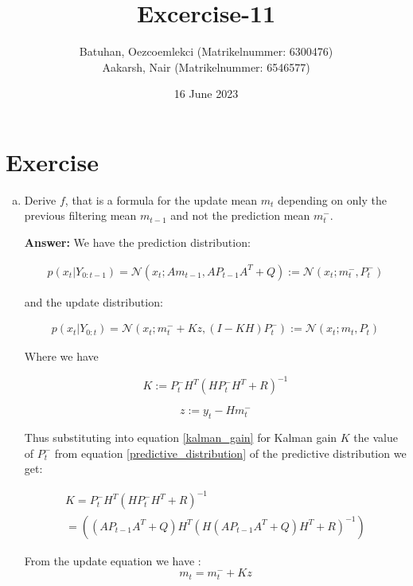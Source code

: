 \documentclass{tufte-handout}
\title{Excercise-11}
\author{Batuhan, Oezcoemlekci (Matrikelnummer: 6300476) \\
         Aakarsh, Nair (Matrikelnummer: 6546577)}
\date{16 June 2023}
\begin{document}
\maketitle%

\section{Exercise}

\begin{enumerate}[(a)]
    \item Derive $f$, that is a formula for the update mean $m_t$ depending on only the previous filtering mean $m_{t-1}$ and not the prediction mean $m_t^{-}$.

    \textbf{Answer:}
    We have the prediction distribution: 
    
\begin{multline}
   p(x_t | Y_{0:t-1}) = \mathcal{N}(x_t; Am_{t-1}, AP_{t-1}A^T + Q) := \mathcal{N}(x_t; m_t^{-}, P_t^{-})
   \label{predictive_distribution}
\end{multline} 

and the update distribution: 

\begin{multline}
    p(x_t | Y_{0:t}) = \mathcal{N}(x_t; m_t^{-} + Kz, (I - KH) P^{-}_t) := \mathcal{N}(x_t; m_t, P_t)
\end{multline}

Where we have 

\begin{equation}
    K:= P_t^{-} H^T (HP_t^{-}H^T + R)^{-1}
    \label{kalman_gain}
\end{equation}


\begin{equation}
    z := y_t - H m^{-}_t
\end{equation}

Thus substituting into equation \ref{kalman_gain} for Kalman gain $K$ the value of  $P_t^{-}$ from equation \ref{predictive_distribution} of the predictive distribution we get:

\begin{multline}
    K= P_t^{-} H^T (HP_t^{-}H^T + R)^{-1}  \\ 
     = \left((AP_{t-1} A^T + Q) H^T ( H (AP_{t-1}A^T + Q) H^T + R)^{-1} \right)
\end{multline}

From the update equation we have :
\begin{equation}
    m_t = m^{-}_t + Kz
\end{equation}


\end{enumerate}
\end{document}
